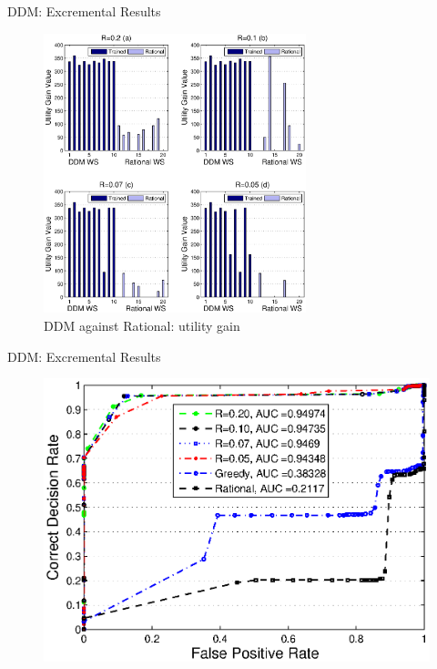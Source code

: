 \documentclass{beamer}
\begin{document}
\begin{frame}{DDM: Excremental Results}
    \begin{figure}[htbp]
    \centering
    \includegraphics[width=3in]{figures/utility_gain.eps}
    \caption{DDM against Rational: utility gain }
    \label{utility_gain_mlisa_and_rational}
    \end{figure}
\end{frame}
\begin{frame}{DDM: Excremental Results}
    \begin{figure}[htbp]
        \centering
        \includegraphics[width=0.9 \columnwidth]{figures/roc.eps}
    \end{figure}
\end{frame}
\end{document}
